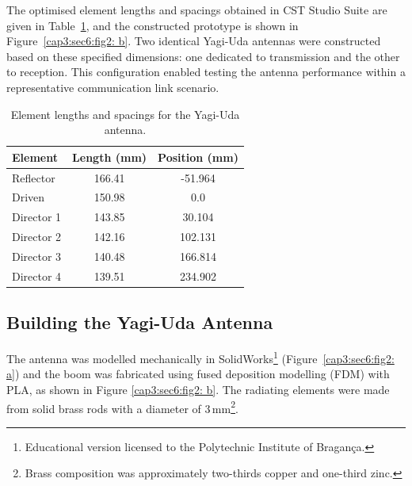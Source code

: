 The optimised element lengths and spacings obtained in CST Studio Suite are given in Table~\ref{cap3:sec6:table1}\protect\footnotemark{}, and the constructed prototype is shown in Figure~\ref{cap3:sec6:fig2: b}. 
Two identical Yagi-Uda antennas were constructed based on these specified dimensions: one dedicated to transmission and the other to reception. This configuration enabled testing the antenna performance within a representative communication link scenario.


\begin{table}[H]
\centering
\caption{Element lengths and spacings for the Yagi-Uda antenna.}
\label{cap3:sec6:table1}
\begin{tabular}{lcc}
\hline
Element & Length (mm) & Position (mm) \\
\hline
Reflector & 166.41 & -51.964 \\
Driven & 150.98 & 0.0 \\
Director 1 & 143.85 & 30.104 \\
Director 2 & 142.16 & 102.131 \\
Director 3 & 140.48 & 166.814 \\
Director 4 & 139.51 & 234.902 \\
\hline
\end{tabular}
\end{table}


\subsection{Building the Yagi-Uda Antenna}
\label{cap3:sec6:subsec2:build_antenna}

The antenna was modelled mechanically in SolidWorks\footnote{Educational version licensed to the Polytechnic Institute of Bragança.} (Figure~\ref{cap3:sec6:fig2: a}) and the boom was fabricated using fused deposition modelling (FDM) with PLA, as shown in Figure \ref{cap3:sec6:fig2: b}. The radiating elements were made from solid brass rods with a diameter of 3\,mm\footnote{Brass composition was approximately two-thirds copper and one-third zinc.}. %



